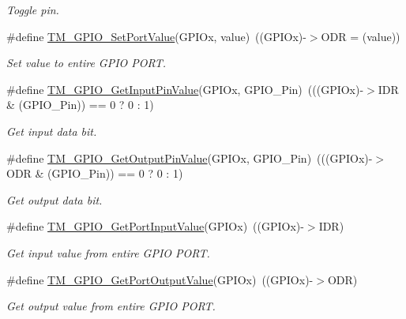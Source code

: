 \begin{DoxyCompactItemize}
\begin{DoxyCompactList}\small\item\em Toggle pin. \end{DoxyCompactList}\item 
\#define \hyperlink{group___t_m___g_p_i_o___functions_ga191a4bbb4e55573d19eb5c2f18122680}{T\+M\+\_\+\+G\+P\+I\+O\+\_\+\+Set\+Port\+Value}(G\+P\+I\+Ox,  value)~((G\+P\+I\+Ox)-\/$>$O\+D\+R = (value))
\begin{DoxyCompactList}\small\item\em Set value to entire G\+P\+I\+O P\+O\+R\+T. \end{DoxyCompactList}\item 
\#define \hyperlink{group___t_m___g_p_i_o___functions_gacd91a02149d1f1bc648a3fe06648460d}{T\+M\+\_\+\+G\+P\+I\+O\+\_\+\+Get\+Input\+Pin\+Value}(G\+P\+I\+Ox,  G\+P\+I\+O\+\_\+\+Pin)~(((G\+P\+I\+Ox)-\/$>$I\+D\+R \& (G\+P\+I\+O\+\_\+\+Pin)) == 0 ? 0 \+: 1)
\begin{DoxyCompactList}\small\item\em Get input data bit. \end{DoxyCompactList}\item 
\#define \hyperlink{group___t_m___g_p_i_o___functions_ga6402ec4503fa0f3380d3bdbb1d9510db}{T\+M\+\_\+\+G\+P\+I\+O\+\_\+\+Get\+Output\+Pin\+Value}(G\+P\+I\+Ox,  G\+P\+I\+O\+\_\+\+Pin)~(((G\+P\+I\+Ox)-\/$>$O\+D\+R \& (G\+P\+I\+O\+\_\+\+Pin)) == 0 ? 0 \+: 1)
\begin{DoxyCompactList}\small\item\em Get output data bit. \end{DoxyCompactList}\item 
\#define \hyperlink{group___t_m___g_p_i_o___functions_gabab8c885687b36adc083ae906f5d432e}{T\+M\+\_\+\+G\+P\+I\+O\+\_\+\+Get\+Port\+Input\+Value}(G\+P\+I\+Ox)~((G\+P\+I\+Ox)-\/$>$I\+D\+R)
\begin{DoxyCompactList}\small\item\em Get input value from entire G\+P\+I\+O P\+O\+R\+T. \end{DoxyCompactList}\item 
\#define \hyperlink{group___t_m___g_p_i_o___functions_gaa84d8eae98478601cb845dfc13089769}{T\+M\+\_\+\+G\+P\+I\+O\+\_\+\+Get\+Port\+Output\+Value}(G\+P\+I\+Ox)~((G\+P\+I\+Ox)-\/$>$O\+D\+R)
\begin{DoxyCompactList}\small\item\em Get output value from entire G\+P\+I\+O P\+O\+R\+T. \end{DoxyCompactList}\end{DoxyCompactItemize}
